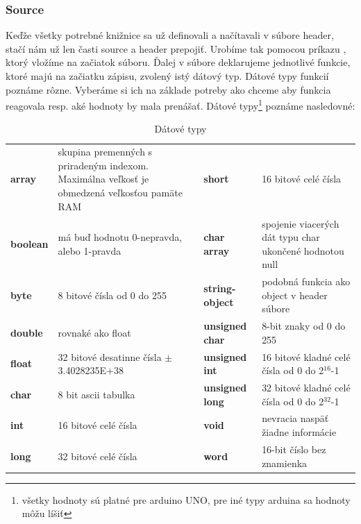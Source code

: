 \subsubsection{Source}

Keďže všetky potrebné knižnice sa už definovali a načítavali v súbore header, stačí nám už len časti source a header prepojiť. Urobíme tak pomocou príkazu , ktorý vložíme na začiatok súboru. Ďalej v súbore deklarujeme jednotlivé funkcie, ktoré majú na začiatku zápisu, zvolený istý dátový typ. Dátové typy funkcií poznáme rôzne. Vyberáme si ich na základe potreby ako chceme aby funkcia reagovala resp. aké hodnoty by mala prenášať. Dátové typy\footnote[6]{všetky hodnoty sú platné pre arduino UNO, pre iné typy arduina sa hodnoty môžu líšiť} poznáme nasledovné\cite{datovetypy}: 

\begin{table}[!ht]
	\centering
	\begin{tabular}{|p{} | p{} |p{} |p{} |}
		\hline
		\thead{dátový typ} & \thead{vlastnosti} & \thead{dátový typ} & \thead{vlastnosti} \\ \hline
		\textbf{array} & skupina premenných s priradeným indexom. Maximálna veľkosť je obmedzená veľkosťou pamäte RAM & \textbf{short }& 16 bitové celé čísla \\ \hline
		\textbf{boolean} & má buď hodnotu 0-nepravda, alebo 1-pravda & \textbf{char array }& spojenie viacerých dát typu char ukončené hodnotou null \\\hline
		\textbf{byte} & 8 bitové čísla od 0 do 255 & \textbf{string-object} & podobná funkcia ako object v header súbore \\ \hline
		\textbf{double} & rovnaké ako float & \textbf{unsigned char} & 8-bit znaky od 0 do 255 \\ \hline
		\textbf{float} & 32 bitové desatinne čísla $\pm$3.4028235E$+38$ & \textbf{unsigned int }& 16 bitové kladné celé čísla od 0 do 2$^{16}$-1 \\\hline
		\textbf{char} & 8 bit ascii tabulka & \textbf{unsigned long} & 32 bitové kladné celé čísla od 0 do 2$^{32}$-1 \\\hline
		\textbf{int} & 16 bitové celé čísla & \textbf{void }& nevracia naspäť žiadne informácie \\ \hline
		\textbf{long }& 32 bitové celé čísla & \textbf{word} & 16-bit číslo bez znamienka \\ \hline
    \end{tabular}
\caption{Dátové typy}
\label{tabulka typov}
\end{table}


